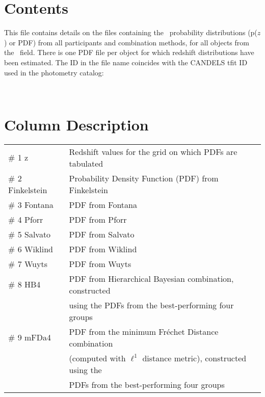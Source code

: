 \section*{Contents}
This file contains details on the files containing the \photoz\ probability distributions (p($z$) or PDF) from all participants and combination methods, for all objects from the \field\ field.  There is one PDF file per object for which redshift distributions have been estimated. The ID in the file name coincides with the CANDELS tfit ID used in the photometry catalog:

\photomcat\

\section*{Column Description}

\begin{center}
\begin{tabular}{ll}
\# 1 z            &	 Redshift values for the grid on which PDFs are tabulated \\
\# 2 Finkelstein  &  Probability Density Function (PDF) from Finkelstein \\
\# 3 Fontana 	  &	 PDF from Fontana \\
\# 4 Pforr 		  &	 PDF from Pforr \\
\# 5 Salvato 	  &	 PDF from Salvato \\
\# 6 Wiklind 	  &	 PDF from Wiklind \\
\# 7 Wuyts 		  &	 PDF from Wuyts \\
\# 8 HB4	  	  &	 PDF from Hierarchical Bayesian combination, constructed\\
                  &  using the PDFs from the best-performing four groups \\
\# 9 mFDa4	 	  &	 PDF from the minimum Fr\'{e}chet Distance combination\\
                  &  (computed with $\ell^1$ distance metric), constructed using the\\
                  &  PDFs from the best-performing four groups\\
\end{tabular}
\end{center}



